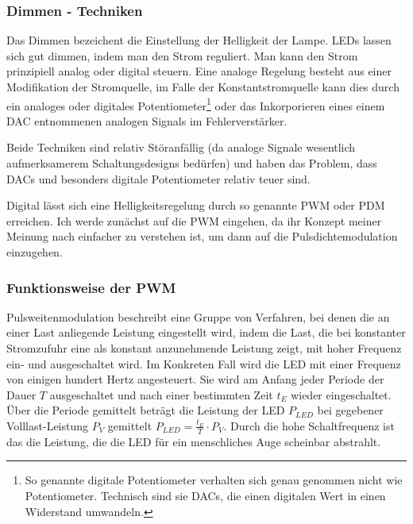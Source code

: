 \documentclass[12pt,a4paper,notitlepage]{article}
\begin{document}
\subsubsection{Dimmen - Techniken}
Das Dimmen bezeichent die Einstellung der Helligkeit der Lampe. \glspl{LED} lassen sich gut dimmen, indem man den Strom reguliert. Man kann den Strom prinzipiell analog oder digital steuern. Eine analoge Regelung besteht aus einer Modifikation der Stromquelle, im Falle der Konstantstromquelle kann dies durch ein analoges oder digitales Potentiometer\footnote{So genannte digitale Potentiometer verhalten sich genau genommen nicht wie Potentiometer. Technisch sind sie \glspl{DAC}, die einen digitalen Wert in einen Widerstand umwandeln.} oder das Inkorporieren eines einem \gls{DAC} entnommenen analogen Signals im Fehlerverstärker.

Beide Techniken sind relativ Störanfällig (da analoge Signale wesentlich aufmerksamerem Schaltungsdesigns bedürfen) und haben das Problem, dass \glspl{DAC} und besonders digitale Potentiometer relativ teuer sind.

Digital lässt sich eine Helligkeitsregelung durch so genannte \gls{PWM} oder \gls{PDM} erreichen. Ich werde zunächst auf die \gls{PWM} eingehen, da ihr Konzept meiner Meinung nach einfacher zu verstehen ist, um dann auf die Pulsdichtemodulation einzugehen.

\subsubsection{Funktionsweise der PWM}
Pulsweitenmodulation beschreibt eine Gruppe von Verfahren, bei denen die an einer Last anliegende Leistung eingestellt wird, indem die Last, die bei konstanter Stromzufuhr eine als konstant anzunehmende Leistung zeigt, mit hoher Frequenz ein- und ausgeschaltet wird. Im Konkreten Fall wird die \gls{LED} mit einer Frequenz von einigen hundert \gls{Hertz} angesteuert. Sie wird am Anfang jeder Periode der Dauer $T$ ausgeschaltet und nach einer bestimmten Zeit $t_E$ wieder eingeschaltet. Über die Periode gemittelt beträgt die Leistung der \gls{LED} $P_{LED}$ bei gegebener Volllast-Leistung $P_V$ gemittelt $P_{LED}=\frac{t_E}{T}\cdot P_{V}$. Durch die hohe Schaltfrequenz ist das die Leistung, die die \gls{LED} für ein menschliches Auge scheinbar abstrahlt.
\end{document}
